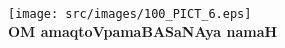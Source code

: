 ~\vfill

\begin{center}
\texttt{[image: src/images/100\_PICT\_6.eps]}\\
{\bf OM amaqtoVpamaBASaNAya namaH}
\end{center}

~\vfill
